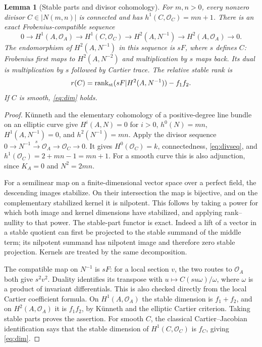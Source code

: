 \documentclass[11pt]{article}
\newtheorem{lemma}[theorem]{Lemma}
\theoremstyle{definition}\newtheorem{definition}[theorem]{Definition}
\theoremstyle{remark}\newtheorem{remark}[theorem]{Remark}
\newcommand{\OO}{\mathcal O}
\newcommand{\rk}{\operatorname{rank}}
\begin{document}
\begin{lemma}[Stable parts and divisor cohomology]\label{lem:cohom}
For $m,n>0$, every nonzero divisor $C\in|N(m,n)|$ is connected and has $h^1(C,\OO_C)=mn+1$. There is an exact Frobenius-compatible sequence
\begin{equation}\label{eq:divseq}
0\to H^1(A,\OO_A)\to H^1(C,\OO_C)\to
H^2(A,N^{-1})\to H^2(A,\OO_A)\to0.
\end{equation}
The endomorphism of $H^2(A,N^{-1})$ in this sequence is $sF$, where $s$ defines $C$: Frobenius first maps to $H^2(A,N^{-2})$ and multiplication by $s$ maps back. Its dual is multiplication by $s$ followed by Cartier trace. The relative stable rank is
\[
 r(C)=\rk_{\rm st}(sF|H^2(A,N^{-1}))-f_1f_2.
\]
If $C$ is smooth, \eqref{eq:dim} holds.
\end{lemma}
\begin{proof}
K\"unneth and the elementary cohomology of a positive-degree line bundle on an elliptic curve give $H^i(A,N)=0$ for $i>0$, $h^0(N)=mn$, $H^1(A,N^{-1})=0$, and $h^2(N^{-1})=mn$. Apply the divisor sequence $0\to N^{-1}\xrightarrow{s}\OO_A\to\OO_C\to0$. It gives $H^0(\OO_C)=k$, connectedness, \eqref{eq:divseq}, and $h^1(\OO_C)=2+mn-1=mn+1$. For a smooth curve this is also adjunction, since $K_A=0$ and $N^2=2mn$.

For a semilinear map on a finite-dimensional vector space over a perfect field, the descending images stabilize. On their intersection the map is bijective, and on the complementary stabilized kernel it is nilpotent. This follows by taking a power for which both image and kernel dimensions have stabilized, and applying rank--nullity to that power. The stable-part functor is exact. Indeed a lift of a vector in a stable quotient can first be projected to the stable summand of the middle term; its nilpotent summand has nilpotent image and therefore zero stable projection. Kernels are treated by the same decomposition.

The compatible map on $N^{-1}$ is $sF$: for a local section $v$, the two routes to $\OO_A$ both give $s^2v^2$. Duality identifies its transpose with $u\mapsto C(su\omega)/\omega$, where $\omega$ is a product of invariant differentials. This is also checked directly from the local Cartier coefficient formula. On $H^1(A,\OO_A)$ the stable dimension is $f_1+f_2$, and on $H^2(A,\OO_A)$ it is $f_1f_2$, by K\"unneth and the elliptic Cartier criterion. Taking stable parts proves the assertion. For smooth $C$, the classical Cartier--Jacobian identification says that the stable dimension of $H^1(C,\OO_C)$ is $f_C$, giving \eqref{eq:dim}.
\end{proof}
\end{document}
